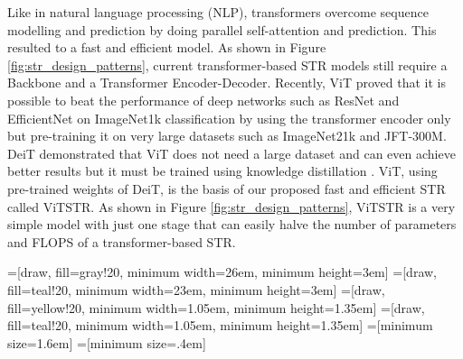 \documentclass[runningheads]{llncs}
\begin{document}
Like in natural language processing (NLP), transformers overcome sequence modelling and prediction by doing parallel self-attention and prediction. This resulted to a fast and efficient model. As shown in Figure \ref{fig:str_design_patterns}, current transformer-based STR models still require a Backbone and a Transformer Encoder-Decoder. Recently, ViT \cite{dosovitskiy2020image} proved that it is possible to beat the performance of deep networks such as ResNet \cite{he2016deep} and EfficientNet \cite{tan2019efficientnet} on ImageNet1k \cite{russakovsky2015imagenet} classification by using the transformer encoder only but pre-training it on very large datasets such as ImageNet21k and JFT-300M. DeiT \cite{touvron2020training} demonstrated that ViT does not need a large dataset and can even achieve better results but it must be trained using knowledge distillation \cite{hinton2015distilling}. ViT, using pre-trained weights of DeiT, is the basis of our proposed fast and efficient STR called ViTSTR. As shown in Figure \ref{fig:str_design_patterns}, ViTSTR is a very simple model with just one stage that can easily halve the number of parameters and FLOPS of a transformer-based STR.



=[draw, fill=gray!20, minimum width=26em, minimum height=3em]
=[draw, fill=teal!20, minimum width=23em, minimum height=3em]
=[draw, fill=yellow!20, minimum width=1.05em, minimum height=1.35em]
=[draw, fill=teal!20, minimum width=1.05em, minimum height=1.35em]
=[minimum size=1.6em]
=[minimum size=.4em]
\end{document}
